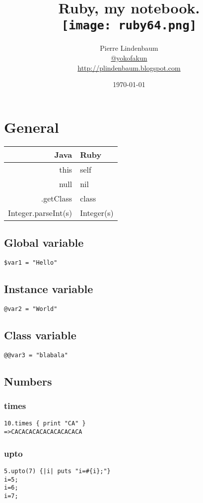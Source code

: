 \documentclass{article}
\date{\today}
\title{Ruby, my notebook.\\\texttt{[image: ruby64.png]}}
\author{Pierre Lindenbaum\\\href{https://twitter.com/yokofakun}{@yokofakun}\\\url{http://plindenbaum.blogspot.com} }
\begin{document}
\maketitle

\tableofcontents

\section{General}

\begin{tabular}{ r || l }
Java & Ruby \\
\hline                        
this & self \\
null & nil \\
.getClass & class \\
Integer.parseInt(s) & Integer(s) \\
\end{tabular}

\subsection{Global variable}
\begin{lstlisting}
$var1 = "Hello"
\end{lstlisting}
\subsection{Instance variable}
\begin{lstlisting}
@var2 = "World"
\end{lstlisting}

\subsection{Class variable}
\begin{lstlisting}
@@var3 = "blabala"
\end{lstlisting}

\subsection{Numbers}
\subsubsection{times}
\begin{lstlisting}
10.times { print "CA" }
=>CACACACACACACACACACA
\end{lstlisting}
\subsubsection{upto}
\begin{lstlisting}
5.upto(7) {|i| puts "i=#{i};"}
i=5;
i=6;
i=7;
\end{lstlisting}
\end{document}
